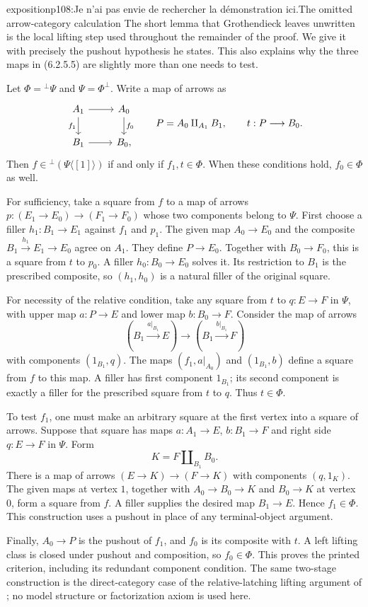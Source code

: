 \begin{dcomment}{exposition}{p108:Je n'ai pas envie de rechercher la démonstration ici.}{The omitted arrow-category calculation}
The short lemma that Grothendieck leaves unwritten is the local lifting step used throughout the remainder of the proof. We give it with precisely the pushout hypothesis he states. This also explains why the three maps in (6.2.5.5) are slightly more than one needs to test.

Let $\Phi={}^\perp\Psi$ and $\Psi=\Phi^\perp$. Write a map of arrows as
\[
\begin{tikzcd}
 A_1\arrow[r]\arrow[d,"f_1"']&A_0\arrow[d,"f_0"]\\
 B_1\arrow[r]&B_0,
\end{tikzcd}
\qquad
 P=A_0\amalg_{A_1}B_1,\qquad t:P\longrightarrow B_0.
\]
Then $f\in{}^\perp(\Psi\langle[1]\rangle)$ if and only if $f_1,t\in\Phi$. When these conditions hold, $f_0\in\Phi$ as well.

For sufficiency, take a square from $f$ to a map of arrows $p:(E_1\to E_0)\to(F_1\to F_0)$ whose two components belong to $\Psi$. First choose a filler $h_1:B_1\to E_1$ against $f_1$ and $p_1$. The given map $A_0\to E_0$ and the composite $B_1\xrightarrow{h_1}E_1\to E_0$ agree on $A_1$. They define $P\to E_0$. Together with $B_0\to F_0$, this is a square from $t$ to $p_0$. A filler $h_0:B_0\to E_0$ solves it. Its restriction to $B_1$ is the prescribed composite, so $(h_1,h_0)$ is a natural filler of the original square.

For necessity of the relative condition, take any square from $t$ to $q:E\to F$ in $\Psi$, with upper map $a:P\to E$ and lower map $b:B_0\to F$. Consider the map of arrows
\[
 (B_1\xrightarrow{a|_{B_1}}E)
 \longrightarrow
 (B_1\xrightarrow{b|_{B_1}}F)
\]
with components $(1_{B_1},q)$. The maps $(f_1,a|_{A_0})$ and $(1_{B_1},b)$ define a square from $f$ to this map. A filler has first component $1_{B_1}$; its second component is exactly a filler for the prescribed square from $t$ to $q$. Thus $t\in\Phi$.

To test $f_1$, one must make an arbitrary square at the first vertex into a square of arrows. Suppose that square has maps $a:A_1\to E$, $b:B_1\to F$ and right side $q:E\to F$ in $\Psi$. Form
\[
 K=F\amalg_{B_1}B_0.
\]
There is a map of arrows $(E\to K)\to(F\to K)$ with components $(q,1_K)$. The given maps at vertex $1$, together with $A_0\to B_0\to K$ and $B_0\to K$ at vertex $0$, form a square from $f$. A filler supplies the desired map $B_1\to E$. Hence $f_1\in\Phi$. This construction uses a pushout in place of any terminal-object argument.

Finally, $A_0\to P$ is the pushout of $f_1$, and $f_0$ is its composite with $t$. A left lifting class is closed under pushout and composition, so $f_0\in\Phi$. This proves the printed criterion, including its redundant component condition. The same two-stage construction is the direct-category case of the relative-latching lifting argument of \citet[Observation~4.16]{RiehlVerity2014Reedy}; no model structure or factorization axiom is used here.
\end{dcomment}

